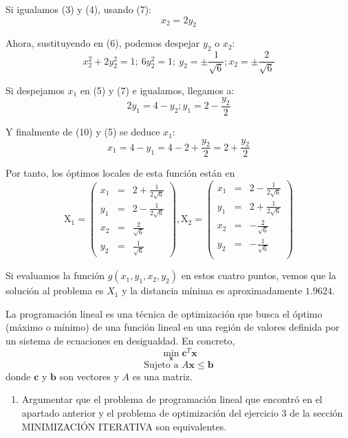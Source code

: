\documentclass[11pt,leqno]{article}
\theoremstyle{definition}
\begin{document}
\begin{solucion}
	Si igualamos (3) y (4), usando (7):
	\begin{equation}
		x_2=2 y_2
	\end{equation}
	
	Ahora, sustituyendo en (6), podemos despejar $y_2$ o $x_2$:
	\begin{equation}
		x_2^2 + 2y_2^2 = 1;\ 6y_2^2 = 1;\ y_2=\pm \frac{1}{\sqrt{6}}; x_2 = \pm \frac{2}{\sqrt{6}}
	\end{equation}
	
	Si despejamos $x_1$ en (5) y (7) e igualamos, llegamos a:
	\begin{equation}
		2y_1 = 4 - y_2; y_1 = 2 - \frac{y_2}{2}
	\end{equation}
	
	Y finalmente de (10) y (5) se deduce $x_1$:
	\begin{equation}
		x_1 = 4 - y_1 = 4  - 2 + \frac{y_2}{2} = 2 + \frac{y_2}{2}
	\end{equation}
	
	Por tanto, los óptimos locales de esta función están en 
	\[ 
	\mathrm{X_1}=\left(\begin{array}{ccl}  
		x_1 & = & 2+\frac{1}{2\sqrt{6}} \\
		y_1 & = & 2-\frac{1}{2\sqrt{6}} \\
		x_2 & = & \frac{2}{\sqrt{6}}    \\
		y_2 & = & \frac{1}{\sqrt{6}}    
	\end{array}	\right), 
	\mathrm{X_2}=\left(\begin{array}{ccl}  
		x_1 & = & 2-\frac{1}{2\sqrt{6}} \\
		y_1 & = & 2+\frac{1}{2\sqrt{6}} \\
		x_2 & = & -\frac{2}{\sqrt{6}}   \\
		y_2 & = & -\frac{1}{\sqrt{6}}   \\
	\end{array}	\right)
	\]
	
	Si evaluamos la función $g(x_1,y_1,x_2,y_2)$ en estos cuatro puntos, vemos que la solución al problema es $X_1$ y la distancia mínima es aproximadamente $1.9624$.
	
	
\end{solucion}


\begin{cuestion}
La programación lineal es una técnica de optimización que busca el óptimo (máximo o mínimo) de una función lineal en una región de valores definida por un sistema de ecuaciones en desigualdad. En concreto, 
    \[ \min_{\mathbf{x}} \mathbf{c}^T\mathbf{x} \]
    \[ \text{Sujeto a } A\mathbf{x} \leq \mathbf{b} \]
    donde $\mathbf{c}$ y $\mathbf{b}$ son vectores y $A$ es una matriz.
    \begin{enumerate}[a]
    \item Argumentar que el problema de programación lineal que encontró en el apartado anterior y el problema de optimización del ejercicio 3 de la sección MINIMIZACIÓN ITERATIVA son equivalentes.
	\end{enumerate}
\end{cuestion}
\end{document}
